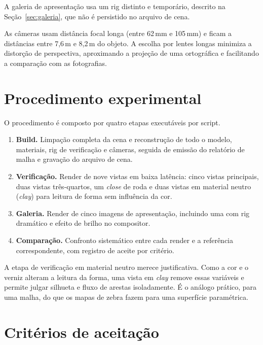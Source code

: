A galeria de apresenta{\c{c}}\~ao usa um rig distinto e tempor\'ario, descrito na
Se{\c{c}}\~ao~\ref{sec:galeria}, que n\~ao \'e persistido no arquivo de cena.

As c\^ameras usam dist\^ancia focal longa (entre 62\,mm e 105\,mm) e ficam a dist\^ancias
entre 7,6\,m e 8,2\,m do objeto. A escolha por lentes longas minimiza a distor{\c{c}}\~ao de
perspectiva, aproximando a proje{\c{c}}\~ao de uma ortogr\'afica e facilitando a
compara{\c{c}}\~ao com as fotografias.

\section{Procedimento experimental}

O procedimento \'e composto por quatro etapas execut\'aveis por script.

\begin{enumerate}[label=\arabic*),leftmargin=1.4cm]
  \item \textbf{Build.} Limpa{\c{c}}\~ao completa da cena e reconstru{\c{c}}\~ao de todo o
        modelo, materiais, rig de verifica{\c{c}}\~ao e c\^ameras, seguida de emiss\~ao do
        relat\'orio de malha e grava{\c{c}}\~ao do arquivo de cena.
  \item \textbf{Verifica{\c{c}}\~ao.} Render de nove vistas em baixa lat\^encia:
        cinco vistas principais, duas vistas tr\^es-quartos, um \emph{close} de roda e duas
        vistas em material neutro (\emph{clay}) para leitura de forma sem influ\^encia da cor.
  \item \textbf{Galeria.} Render de cinco imagens de apresenta{\c{c}}\~ao, incluindo uma com rig
        dram\'atico e efeito de brilho no compositor.
  \item \textbf{Compara{\c{c}}\~ao.} Confronto sistem\'atico entre cada render e a refer\^encia
        correspondente, com registro de aceite por crit\'erio.
\end{enumerate}

A etapa de verifica{\c{c}}\~ao em material neutro merece justificativa. Como a cor e o verniz
alteram a leitura da forma, uma vista em \emph{clay} remove essas vari\'aveis e permite julgar
silhueta e fluxo de arestas isoladamente. \'E o an\'alogo pr\'atico, para uma malha, do que os
mapas de zebra fazem para uma superf\'icie param\'etrica.

\section{Crit\'erios de aceita{\c{c}}\~ao}

